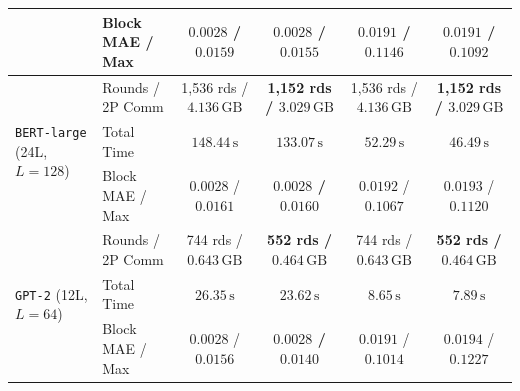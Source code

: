 \begin{tabular}{@{}llcccc@{}}
 & Block MAE / Max & $0.0028$ / $0.0159$ & \textbf{$0.0028$ / $0.0155$} & $0.0191$ / $0.1146$ & $0.0191$ / $0.1092$ \\
\midrule
\multirow{3}{*}{\texttt{BERT-large} (24L, $L=128$)}
 & Rounds / 2P Comm & 1,536 rds / $4.136\,\text{GB}$ & \textbf{1,152 rds / $3.029\,\text{GB}$} & 1,536 rds / $4.136\,\text{GB}$ & \textbf{1,152 rds / $3.029\,\text{GB}$} \\
 & Total Time & $148.44\,\text{s}$ & $133.07\,\text{s}$ & $52.29\,\text{s}$ & \textbf{$46.49\,\text{s}$} \\
 & Block MAE / Max & $0.0028$ / $0.0161$ & \textbf{$0.0028$ / $0.0160$} & $0.0192$ / $0.1067$ & $0.0193$ / $0.1120$ \\
\midrule
\multirow{3}{*}{\texttt{GPT-2} (12L, $L=64$)}
 & Rounds / 2P Comm & 744 rds / $0.643\,\text{GB}$ & \textbf{552 rds / $0.464\,\text{GB}$} & 744 rds / $0.643\,\text{GB}$ & \textbf{552 rds / $0.464\,\text{GB}$} \\
 & Total Time & $26.35\,\text{s}$ & $23.62\,\text{s}$ & $8.65\,\text{s}$ & \textbf{$7.89\,\text{s}$} \\
 & Block MAE / Max & $0.0028$ / $0.0156$ & \textbf{$0.0028$ / $0.0140$} & $0.0191$ / $0.1014$ & $0.0194$ / $0.1227$ \\
\bottomrule
\end{tabular}
